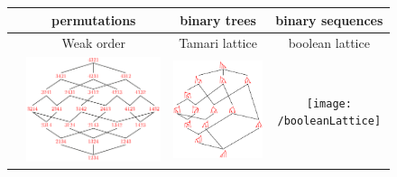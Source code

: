 \documentclass[a4paper,12pt]{article}
\begin{document}
\begin{figure}[h]
%
\begin{tabular}{l|c|c|c}
	& permutations & binary trees & binary sequences \\
	\hline
	& Weak order & Tamari lattice & boolean lattice \\
	\rotatebox{90}{\hspace*{.1cm} Combinatorics} &  \includegraphics[scale=.3]{weakOrder} & \includegraphics[scale=.23]{TamariLattice} & \texttt{[image: /booleanLattice]} \\

\end{tabular}
\end{figure}
\end{document}

